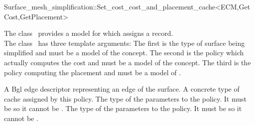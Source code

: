 

\begin{ccRefClass}{Surface_mesh_simplification::Set_cost_cost_and_placement_cache<ECM,GetCost,GetPlacement>}


\ccDefinition

The class \ccRefName\ provides a model for
 which assigns a  record.\\
The class \ccRefName\ has three template arguments: The first is the type of surface
being simplified and must be a model of the  concept.
The second is the policy which actually computes the cost and must be a model
of the  concept. The third is the policy computing the placement
and must be a model of .

\ccIsModel
{}


\ccTypes
  \ccGlue
  {A {\sc Bgl} edge descriptor representing an edge of the surface.}
  \ccGlue
  {A concrete type of cache assigned by this policy.}
  \ccGlue
  {The type of the parameters to the  policy.
  It must be  so it cannot be .}
  \ccGlue
  {The type of the parameters to the   policy. 
  It must be  so it cannot be .} 
            

\end{ccRefClass}
